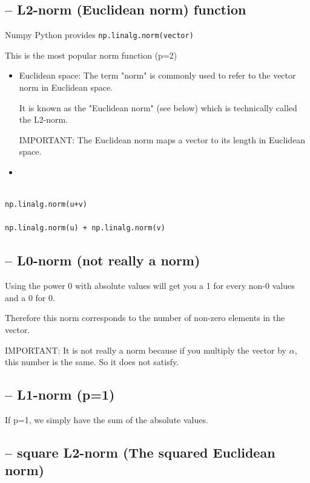 \subsection{-- L2-norm (Euclidean norm) function}

Numpy Python provides \verb!np.linalg.norm(vector)!

This is the most popular norm function (p=2)
\begin{itemize}
  \item Euclidean space: The term "norm" is commonly used to refer to the vector norm in Euclidean space. 
  
   It is known as the "Euclidean norm" (see below) which is technically called the L2-norm. 
   
   IMPORTANT: The Euclidean norm maps a vector to its length in Euclidean space. 
   
  \item 
\end{itemize}

\begin{lstlisting}

np.linalg.norm(u+v)

np.linalg.norm(u) + np.linalg.norm(v)
\end{lstlisting}


\subsection{-- L0-norm (not really a norm)}

Using the power 0 with absolute values will get you a 1 for every non-0 values
and a 0 for 0.

Therefore this norm corresponds to the number of non-zero elements in the
vector. 

IMPORTANT: It is not really a norm because if you multiply the vector by $\alpha$, this
number is the same. So it does not satisfy.

\subsection{-- L1-norm (p=1)}

If p=1, we simply have the sum of the absolute values.


\subsection{-- square L2-norm (The squared Euclidean norm)}

